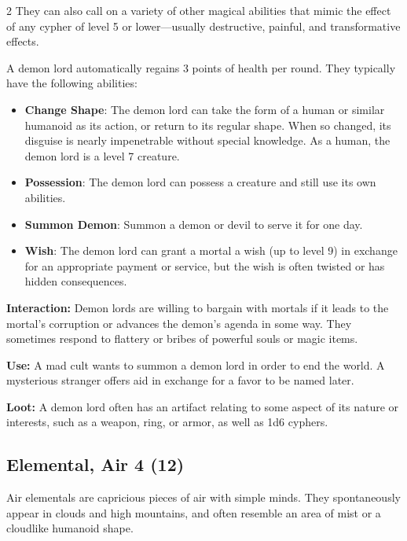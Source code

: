 \begin{multicols}{2}
They can also call on a variety of other magical abilities that mimic the effect of any cypher of level 5 or lower—usually destructive, painful, and transformative effects.

A demon lord automatically regains 3 points of health per round. They typically have the following abilities: 

\begin{itemize}
\item \textbf{Change Shape}: The demon lord can take the form of a human or similar humanoid as its action, or return to its regular shape. When so changed, its disguise is nearly impenetrable without special knowledge. As a human, the demon lord is a level 7 creature. 
\item \textbf{Possession}: The demon lord can possess a creature and still use its own abilities. 
\item \textbf{Summon Demon}: Summon a demon or devil to serve it for one day. 
\item \textbf{Wish}: The demon lord can grant a mortal a wish (up to level 9) in exchange for an appropriate payment or service, but the wish is often twisted or has hidden consequences. 
\end{itemize}

\textbf{Interaction:} Demon lords are willing to bargain with mortals if it leads to the mortal’s corruption or advances the demon’s agenda in some way. They sometimes respond to flattery or bribes of powerful souls or magic items. 

\textbf{Use:} A mad cult wants to summon a demon lord in order to end the world. A mysterious stranger offers aid in exchange for a favor to be named later. 

\textbf{Loot:} A demon lord often has an artifact relating to some aspect of its nature or interests, such as a weapon, ring, or armor, as well as 1d6 cyphers.

\subsection{Elemental, Air 4 (12)}


Air elementals are capricious pieces of air with simple minds. They spontaneously appear in clouds and high mountains, and often resemble an area of mist or a cloudlike humanoid shape. 


\end{multicols}
